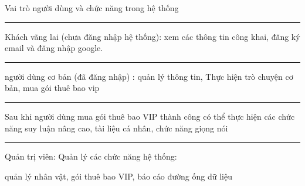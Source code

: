 \begin{frame}{Vai trò người dùng và chức năng trong hệ thống}
{\hrule

Khách vãng lai (chưa đăng nhập hệ thống):
xem các thông tin công khai, đăng ký email và đăng nhập google.

\hrule

người dùng cơ bản (đã đăng nhập) : quản lý thông tin, Thực hiện trò chuyện cơ bản, mua gói thuê bao vip

\hrule

Sau khi người dùng mua gói thuê bao VIP thành công có thể thực hiện các chức năng suy luận nâng cao, tài liệu cá nhân, chức năng giọng nói

\hrule

Quản trị viên: Quản lý các chức năng hệ thống:

quản lý nhân vật, gói thuê bao VIP, báo cáo đường ống dữ liệu

}
\end{frame}




